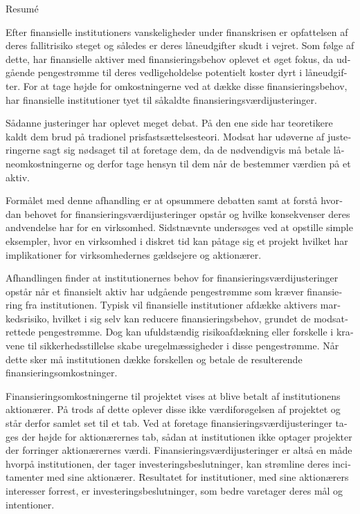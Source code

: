 \documentclass[main.tex]{subfiles}
\begin{document}
    \begin{otherlanguage}{danish}
    \thispagestyle{empty}
    \begin{adjustwidth}{-1cm}{-1cm}
    \begin{center}
    {\LARGE Resumé}
    \end{center}

    Efter finansielle institutioners vanskeligheder under finanskrisen 
    er opfattelsen af deres fallitrisiko steget og således er deres låneudgifter skudt i vejret.
    Som følge af dette, har finansielle aktiver med finansieringsbehov oplevet et øget fokus, 
    da udgående pengestrømme til deres vedligeholdelse potentielt koster dyrt i låneudgifter.
    For at tage højde for omkostningerne ved at dække disse finansieringsbehov,
    har finansielle institutioner tyet til såkaldte finansieringsværdijusteringer.

    Sådanne justeringer har oplevet meget debat. 
    På den ene side har teoretikere kaldt dem brud på tradionel prisfastsættelsesteori.
    Modsat har udøverne af justeringerne sagt sig nødsaget til at foretage dem,
    da de nødvendigvis må betale låneomkostningerne 
    og derfor tage hensyn til dem når de bestemmer værdien på et aktiv. 

    Formålet med denne afhandling er at opsummere debatten
    samt at forstå hvordan behovet for finansieringsværdijusteringer opstår 
    og hvilke konsekvenser deres andvendelse har for en virksomhed.
    Sidstnævnte undersøges ved at opstille simple eksempler,
    hvor en virksomhed i diskret tid kan påtage sig et projekt
    hvilket har implikationer for virksomhedernes gældsejere og aktionærer.

    Afhandlingen finder at institutionernes behov for finansieringsværdijusteringer opstår 
    når et finansielt aktiv har udgående pengestrømme som kræver finansiering fra institutionen.
    Typisk vil finansielle institutioner afdække aktivers markedsrisiko,
    hvilket i sig selv kan reducere finansieringsbehov, grundet de modsatrettede pengestrømme.
    Dog kan ufuldstændig risikoafdækning eller forskelle i kravene til sikkerhedsstillelse
    skabe uregelmæssigheder i disse pengestrømme. 
    Når dette sker må institutionen dække forskellen 
    og betale de resulterende finansieringsomkostninger.
    
    Finansieringsomkostningerne til projektet vises at blive betalt af institutionens aktionærer.
    På trods af dette oplever disse ikke værdiforøgelsen af projektet
    og står derfor samlet set til et tab.
    Ved at foretage finansieringsværdijusteringer tages der højde for aktionærernes tab,
    sådan at institutionen ikke optager projekter der forringer aktionærernes værdi.
    Finansieringsværdijusteringer er altså en måde hvorpå institutionen, 
    der tager investeringsbeslutninger, kan strømline deres incitamenter med sine aktionærer. 
    Resultatet for institutioner, med sine aktionærers interesser forrest,
    er investeringsbeslutninger, som bedre varetager deres mål og intentioner.
    
    \end{adjustwidth}
    \end{otherlanguage}
\end{document}
